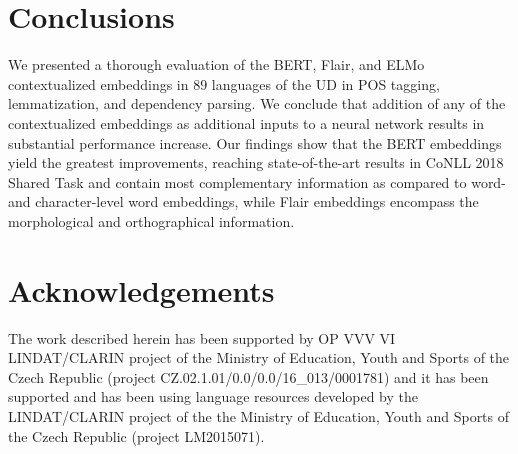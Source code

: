 \documentclass[11pt,a4paper]{article}
\begin{document}
\section{Conclusions}

We presented a thorough evaluation of the BERT, Flair, and ELMo contextualized
embeddings in $89$ languages of the UD in POS tagging, lemmatization, and
dependency parsing. We conclude that addition of any of the contextualized
embeddings as additional inputs to a neural network results in substantial
performance increase. Our findings show that the BERT embeddings yield the
greatest improvements, reaching state-of-the-art results in CoNLL 2018 Shared
Task
and contain most complementary information
as compared to word- and character-level word embeddings,
while Flair
embeddings encompass the morphological and orthographical information.

\section*{Acknowledgements}

The work described herein has been supported by OP VVV VI LINDAT/CLARIN project
of the Ministry of Education, Youth and Sports of the Czech Republic (project
CZ.02.1.01/0.0/0.0/16\_013/0001781) and it has been supported and has been
using language resources developed by the LINDAT/CLARIN project of the the
Ministry of Education, Youth and Sports of the Czech Republic (project
LM2015071).



\end{document}
